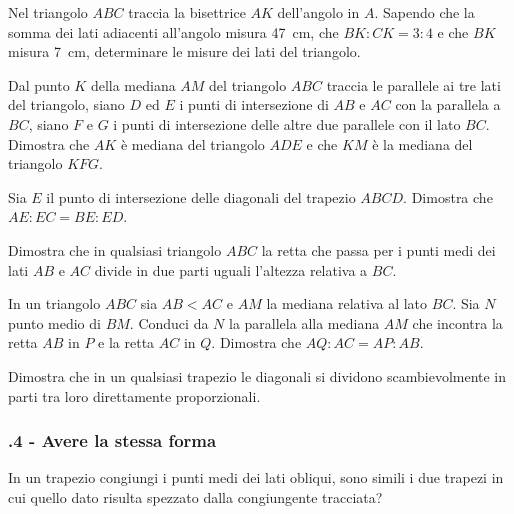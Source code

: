 \begin{multicols}{2}
\begin{esercizio}
\label{ese:6.45}
Nel triangolo $ABC$ traccia la bisettrice $AK$ dell'angolo in $A$. Sapendo che la somma dei lati adiacenti all'angolo misura 47~cm, che $BK : CK = 3 : 4$ e che $BK$ misura 7~cm, determinare le misure dei lati del triangolo.
\end{esercizio}

\begin{esercizio}
\label{ese:6.46}
Dal punto $K$ della mediana $AM$ del triangolo $ABC$ traccia le parallele ai tre lati del triangolo, siano $D$ ed $E$ i punti di intersezione di $AB$ e $AC$ con la parallela a $BC$, siano $F$ e $G$ i punti di intersezione delle altre due parallele con il lato $BC$. Dimostra che $AK$ è mediana del triangolo $ADE$ e che $KM$ è la mediana del triangolo $KFG$.
\end{esercizio}

\begin{esercizio}
\label{ese:6.47}
Sia $E$ il punto di intersezione delle diagonali del trapezio $ABCD$. Dimostra che $AE : EC = BE : ED$.
\end{esercizio}

\begin{esercizio}
\label{ese:6.48}
Dimostra che in qualsiasi triangolo $ABC$ la retta che passa per i punti medi dei lati $AB$ e $AC$ divide in due parti uguali l'altezza relativa a $BC$.
\end{esercizio}

\begin{esercizio}
\label{ese:6.49}
In un triangolo $ABC$ sia $AB<AC$ e $AM$ la mediana relativa al lato $BC$. Sia $N$ punto medio di $BM$. Conduci da $N$ la parallela alla mediana $AM$ che incontra la retta $AB$ in $P$ e la retta $AC$ in $Q$. Dimostra che $AQ : AC = AP : AB$.
\end{esercizio}

\begin{esercizio}
\label{ese:6.50}
Dimostra che in un qualsiasi trapezio le diagonali si dividono scambievolmente in parti tra loro direttamente proporzionali.
\end{esercizio}

\subsubsection*{\thechapter.4 - Avere la stessa forma}

\begin{esercizio}
\label{ese:6.51}
In un trapezio congiungi i punti medi dei lati obliqui, sono simili i due trapezi in cui quello dato risulta spezzato dalla congiungente tracciata? 
\end{esercizio}


\end{multicols}
